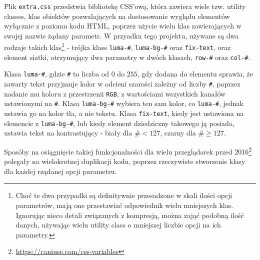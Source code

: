 \documentclass[licencjacka]{pracadypl}
\begin{document}
Plik \texttt{extra.css} przedstwia bibliotekę CSS'ową, która zawiera wiele tzw. utility classes, klas obiektów pozwalających na dostosowanie wyglądu elementów wyłącznie z poziomu kodu HTML, poprzez użycie wielu klas zawierających w swojej nazwie żądany parametr. W przyadku tego projektu, używane są dwa rodzaje takich klas\footnote{Choć te dwa przypadki są definitywnie przesadzone w skali ilości opcji parametrów, mają one przestawiać odpowiednik wielu mniejszych klas. Ignorując nieco detali związanych z kompresją, można zająć podobną ilość danych, używając wielu utility class o mniejszej liczbie opcji na ich parametry.} - trójka klass \texttt{luma-\#}, \texttt{luma-bg-\#} oraz \texttt{fix-text}, oraz element siatki, otrzymujący dwa parametry w dwóch klasach, \texttt{row-\#} oraz \texttt{col-\#}.

Klasa \texttt{luma-\#}, gdzie \texttt{\#} to liczba od $0$ do $255$, gdy dodana do elementu sprawia, że zawarty tekst przyjmuje kolor w odcieni szarości zależny od liczby \texttt{\#}, poprzez nadanie mu koloru z przestrzenii \texttt{RGB}, z wartościami wszystkich kanałów ustawionymi na \texttt{\#}. Klasa \texttt{luma-bg-\#} wybiera ten sam kolor, co \texttt{luma-\#}, jednak ustawia go na kolor tła, a nie tekstu. Klasa \texttt{fix-text}, kiedy jest ustawiona na elemencie z \texttt{luma-bg-\#}, lub kiedy element dziedziczny takowego ją posiada, ustawia tekst na kontrastujący - biały dla $\texttt{\#} < 127$, czarny dla $\texttt{\#} \geq 127$.

Sposóby na osiągnięcie takiej funkcjonalności dla wielu przeglądarek przed 2016\footnote{\url{https://caniuse.com/css-variables}} polegały na wielokrotnej duplikacji kodu, poprzez rzeczywiste stworzenie klasy dla każdej rządanej opcji parametru.
\end{document}
